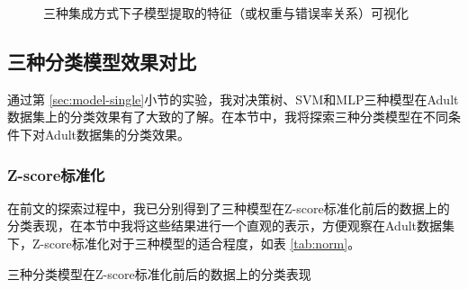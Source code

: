 \documentclass[12pt,a4paper]{article}
\theoremstyle{definition}
\begin{document}
{\begin{figure}[H]
	\centering
	\caption{三种集成方式下子模型提取的特征（或权重与错误率关系）可视化}
	\label{fig:model-plus2}
\end{figure}

\subsection{三种分类模型效果对比}
\label{sec:compare}

通过第 \ref{sec:model-single}小节的实验，我对决策树、SVM和MLP三种模型在Adult数据集上的分类效果有了大致的了解。在本节中，我将探索三种分类模型在不同条件下对Adult数据集的分类效果。

\subsubsection{Z-score标准化}

在前文的探索过程中，我已分别得到了三种模型在Z-score标准化前后的数据上的分类表现，在本节中我将这些结果进行一个直观的表示，方便观察在Adult数据集下，Z-score标准化对于三种模型的适合程度，如表 \ref{tab:norm}。

\begin{table}[H]
	\renewcommand\arraystretch{1.35}
	\caption{三种分类模型在Z-score标准化前后的数据上的分类表现}
	\label{tab:norm}
	\centering
	

\end{table}}
\end{document}

